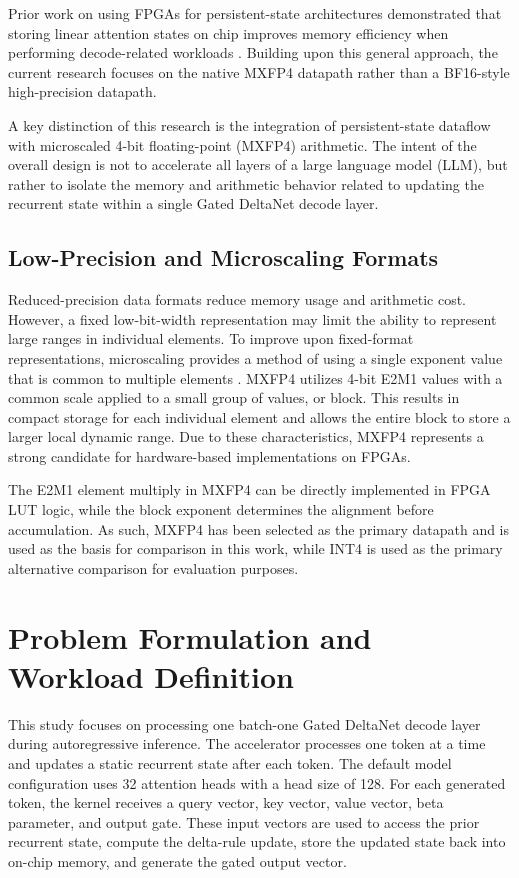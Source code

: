 ﻿\documentclass[conference]{IEEEtran}
\begin{document}
Prior work on using FPGAs for persistent-state architectures demonstrated that storing linear attention states on chip improves memory efficiency when performing decode-related workloads \cite{b10}. Building upon this general approach, the current research focuses on the native MXFP4 datapath rather than a BF16-style high-precision datapath.

A key distinction of this research is the integration of persistent-state dataflow with microscaled 4-bit floating-point (MXFP4) arithmetic. The intent of the overall design is not to accelerate all layers of a large language model (LLM), but rather to isolate the memory and arithmetic behavior related to updating the recurrent state within a single Gated DeltaNet decode layer.

\subsection{Low-Precision and Microscaling Formats}
Reduced-precision data formats reduce memory usage and arithmetic cost. However, a fixed low-bit-width representation may limit the ability to represent large ranges in individual elements. To improve upon fixed-format representations, microscaling provides a method of using a single exponent value that is common to multiple elements \cite{b12}. MXFP4 utilizes 4-bit E2M1 values with a common scale applied to a small group of values, or block. This results in compact storage for each individual element and allows the entire block to store a larger local dynamic range. Due to these characteristics, MXFP4 represents a strong candidate for hardware-based implementations on FPGAs.

The E2M1 element multiply in MXFP4 can be directly implemented in FPGA LUT logic, while the block exponent determines the alignment before accumulation. As such, MXFP4 has been selected as the primary datapath and is used as the basis for comparison in this work, while INT4 is used as the primary alternative comparison for evaluation purposes.

\section{Problem Formulation and Workload Definition}
This study focuses on processing one batch-one Gated DeltaNet decode layer during autoregressive inference. The accelerator processes one token at a time and updates a static recurrent state after each token. The default model configuration uses 32 attention heads with a head size of 128. For each generated token, the kernel receives a query vector, key vector, value vector, beta parameter, and output gate. These input vectors are used to access the prior recurrent state, compute the delta-rule update, store the updated state back into on-chip memory, and generate the gated output vector.
\end{document}
